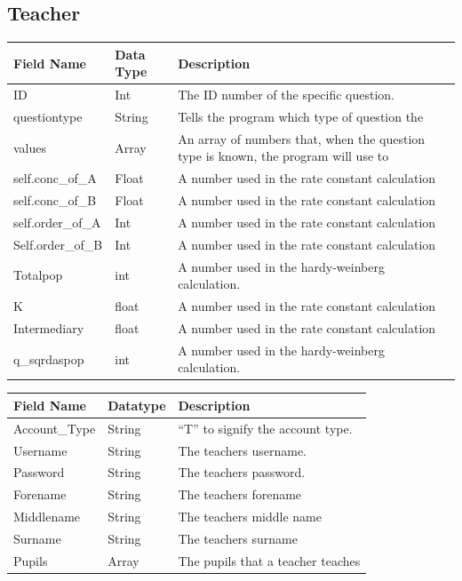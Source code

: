 \documentclass[a4paper,12pt]{report}
\begin{document}
\subsection{Teacher}
\begin{center}
\tablefirsthead{}
\tablehead{}
\tabletail{}
\tablelasttail{}
\begin{supertabular}{|m{1.8in}|m{1.22956in}|m{2.42956in}|}
\hline
Field Name &
Data Type &
Description\\\hline
ID &
Int &
The ID number of the specific question.\\\hline
questiontype &
String &
Tells the program which type of question the \\\hline
values &
Array &
An array of numbers that, when the question type is known, the program will use to \\\hline
self.conc\_of\_A &
Float &
A number used in the rate constant calculation\\\hline
self.conc\_of\_B &
Float &
A number used in the rate constant calculation\\\hline
self.order\_of\_A &
Int &
A number used in the rate constant calculation\\\hline
Self.order\_of\_B &
Int  &
A number used in the rate constant calculation\\\hline
Totalpop &
int &
A number used in the hardy-weinberg calculation.\\\hline
K &
float &
A number used in the rate constant calculation\\\hline
Intermediary &
float &
A number used in the rate constant calculation\\\hline
q\_sqrdaspop &
int &
A number used in the hardy-weinberg calculation.\\\hline
\end{supertabular}
\end{center}

\begin{center}
\tablefirsthead{}
\tablehead{}
\tabletail{}
\tablelasttail{}
\begin{supertabular}{|m{1.8in}|m{1.22956in}|m{2.42956in}|}
\hline
Field Name &
Datatype &
Description\\\hline
Account\_Type &
String &
{}``T{}'' to signify the account type.\\\hline
Username &
String &
The teachers username.\\\hline
Password &
String &
The teachers password.\\\hline
Forename &
String &
The teachers forename\\\hline
Middlename &
String &
The teachers middle name\\\hline
Surname &
String &
The teachers surname \\\hline
Pupils &
Array &
The pupils that a teacher teaches\\\hline
\end{supertabular}
\end{center}
\end{document}
